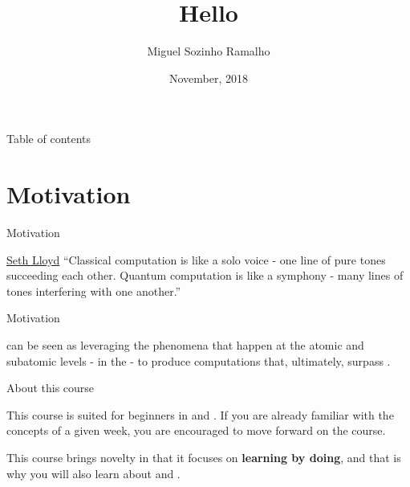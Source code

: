 \documentclass[aspectratio=43]{beamer}
\title{Hello \qw}
\date{November, 2018}
\author[Ramalho]{Miguel Sozinho Ramalho}
\begin{document}
\begin{frame}
	\titlepage
\end{frame}


\begin{frame}{Table of contents}
	\begin{card}
		\tableofcontents
	\end{card}
\end{frame}


\section{Motivation}
\begin{frame}{Motivation}
\begin{card}[Why]
    \begin{chapquote}[2pt]{\href{https://en.wikipedia.org/wiki/Seth_Lloyd}{Seth Lloyd}}
        ``Classical computation is like a solo voice - one line of pure tones succeeding each other. Quantum computation is like a symphony - many lines of tones interfering with one another.''
    \end{chapquote}
\end{card}

\pagenumber
\end{frame}

\begin{frame}{Motivation}
\begin{card}[How]
    \qc can be seen as leveraging the phenomena that happen at the atomic and subatomic levels - in the \qw\xspace- to produce computations that, ultimately, surpass \cc.
\end{card}
\pagenumber
\end{frame}

\begin{frame}{About this course}
\begin{card}
    This course is suited for beginners in \qm and \qc. If you are already familiar with the concepts of a given week, you are encouraged to move forward on the course. 
    
    This course brings novelty in that it focuses on \textbf{learning by doing}, and that is why you will also learn about \qk and \ibmqe.
\end{card}
\pagenumber
\end{frame}
\end{document}
